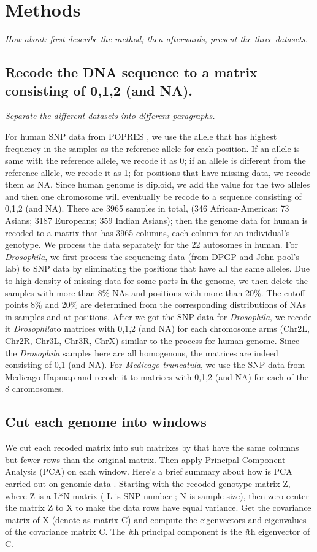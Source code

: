 \documentclass[11pt, oneside]{article}   	%
\newcommand{\plr}[1]{{\em \color{blue} #1}}
\begin{document}
\section{Methods}

\plr{How about: first describe the method; then afterwards, present the three datasets.

\subsection{Recode the DNA sequence to a matrix consisting of 0,1,2 (and NA).}

\plr{Separate the different datasets into different paragraphs.}

For human SNP data from POPRES \cite{key8}, we use the allele that has highest frequency in the samples as the reference allele for each position. If an allele is same with the reference allele, we recode it as 0; if an allele is different from the reference allele, we recode it as 1; for positions that have missing data, we recode them as NA. Since human genome is diploid, we add the value for the two alleles and then one chromosome will eventually be recode to a sequence consisting of 0,1,2 (and NA). There are 3965 samples in total, (346 African-Americas; 73 Asians; 3187 Europeans; 359 Indian Asians); then the genome data for human is recoded to a matrix that has 3965 columns, each column for an individual's genotype. We process the data separately for the 22 autosomes in human. For \textit{Drosophila}, we first process the sequencing data (from DPGP and John pool's lab) to SNP data by eliminating the positions that have all the same alleles. Due to high density of missing data for some parts in the genome, we then delete the samples with more than 8\% NAs and positions with more than 20\%. The cutoff points 8\% and 20\% are determined from the corresponding distributions of NAs in samples and at positions. After we got the SNP data for \textit{Drosophila}, we recode it \textit{Drosophila}to matrices with 0,1,2 (and NA) for each chromosome arms (Chr2L, Chr2R, Chr3L, Chr3R, ChrX) similar to the process for human genome. Since the \textit{Drosophila} samples here are all homogenous, the matrices are indeed consisting of 0,1 (and NA). For \textit{Medicago truncatula}, we use the SNP data from Medicago Hapmap and recode it to matrices with 0,1,2 (and NA) for each of the 8 chromosomes.

\subsection{Cut each genome into windows}
We cut each recoded matrix into sub matrixes by that have the same columns but fewer rows than the original matrix. Then apply Principal Component Analysis (PCA) on each window. Here's a brief summary about how is PCA carried out on genomic data \cite{mcvean2009genealogical}. Starting with the recoded genotype matrix Z, where Z is a L*N matrix ( L is SNP number ; N is sample size), then zero-center the matrix Z to X to make the data rows have equal variance. Get the covariance matrix of X (denote as matrix C) and compute the eigenvectors and eigenvalues of the covariance matrix C. The \textit{i}th principal component is the \textit{i}th eigenvector of C.

}
\end{document}
